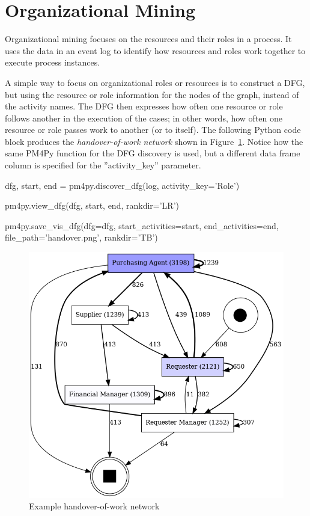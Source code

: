 \FloatBarrier
\section{Organizational Mining}

Organizational mining focuses on the resources and their roles in a process. It uses the data in an event log to identify how resources and roles work together to execute process instances. 

A simple way to focus on organizational roles or resources is to construct a DFG, but using the resource or role information for the nodes of the graph, instead of the activity names. The DFG then expresses how often one resource or role follows another in the execution of the cases; in other words, how often one resource or role passes work to another (or to itself). The following Python code block produces the \emph{handover-of-work network} shown in Figure~\ref{fig:handover}. Notice how the same PM4Py function for the DFG discovery is used, but a different data frame column is specified for the ''activity\_key'' parameter.

\begin{samepage}
\begin{pythoncode}
dfg, start, end = pm4py.discover_dfg(log, activity_key='Role')

pm4py.view_dfg(dfg, start, end, rankdir='LR')

pm4py.save_vis_dfg(dfg=dfg,
    start_activities=start, 
    end_activities=end, 
    file_path='handover.png', rankdir='TB')
\end{pythoncode}
\end{samepage}

\begin{figure}
\centering
\includegraphics[width=.66\textwidth]{handover.png}
\caption{Example handover-of-work network}
\label{fig:handover}
\end{figure}

